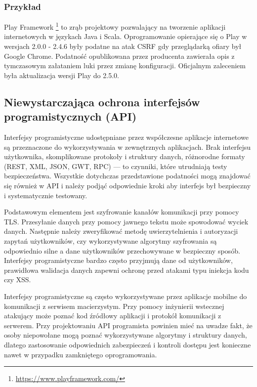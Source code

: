 \documentclass[11pt,a4paper,polish,thesis]{dcsbook}
\begin{document}
\subsubsection*{Przykład}
Play Framework \footnote{\url{https://www.playframework.com/}} to zrąb projektowy pozwalający na tworzenie aplikacji internetowych w językach Java i Scala. Oprogramowanie opierające się o Play w wersjach 2.0.0 - 2.4.6 były podatne na atak CSRF gdy przeglądarką ofiary był Google Chrome. Podatność opublikowana przez producenta \cite{playv1} zawierała opis z tymczasowym załataniem luki przez zmianę konfiguracji. Oficjalnym zaleceniem była aktualizacja wersji Play do 2.5.0.

\subsection{Niewystarczająca ochrona interfejsów programistycznych (API)}
Interfejsy programistyczne udostępniane przez współczesne aplikacje internetowe są przeznaczone do wykorzystywania w zewnętrznych aplikacjach. Brak interfejsu użytkownika, skomplikowane protokoły i struktury danych, różnorodne formaty (REST, XML, JSON, GWT, RPC) --- to czynniki, które utrudniają testy bezpieczeństwa. Wszystkie dotychczas przedstawione podatności mogą znajdować się również w API i należy podjąć odpowiednie kroki aby interfejs był bezpieczny i systematycznie testowany.

Podstawowym elementem jest szyfrowanie kanałów komunikacji przy pomocy TLS. Przesyłanie danych przy pomocy jawnego tekstu może spowodować wyciek danych. Następnie należy zweryfikować metodę uwierzytelnienia i autoryzacji zapytań użytkowników, czy wykorzystywane algorytmy szyfrowania są odpowiednio silne a dane użytkowników przechowywane w bezpieczny sposób. Interfejsy programistyczne bardzo często przyjmują dane od użytkowników, prawidłowa walidacja danych zapewni ochronę przed atakami typu iniekcja kodu czy XSS.

Interfejsy programistyczne są często wykorzystywane przez aplikacje mobilne do komunikacji z serwisem macierzystym. Przy pomocy inżynierii wstecznej atakujący może poznać kod źródłowy aplikacji i protokół komunikacji z serwerem. Przy projektowaniu API programista powinien mieć na uwadze fakt, że osoby niepowołane mogą poznać wykorzystywane algorytmy i struktury danych, dlatego zastosowanie odpowiednich zabezpieczeń i kontroli dostępu jest konieczne nawet w przypadku zamkniętego oprogramowania.
\end{document}
